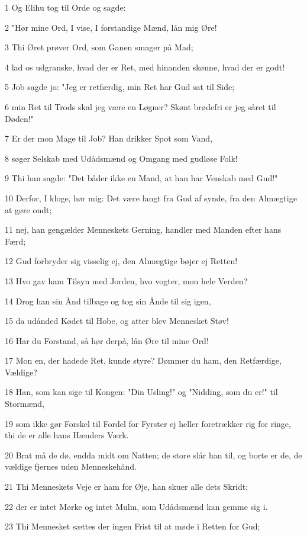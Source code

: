 \par 1 Og Elihu tog til Orde og sagde:
\par 2 "Hør mine Ord, I vise, I forstandige Mænd, lån mig Øre!
\par 3 Thi Øret prøver Ord, som Ganen smager på Mad;
\par 4 lad os udgranske, hvad der er Ret, med hinanden skønne, hvad der er godt!
\par 5 Job sagde jo: "Jeg er retfærdig, min Ret har Gud sat til Side;
\par 6 min Ret til Trods skal jeg være en Løgner? Skønt brødefri er jeg såret til Døden!"
\par 7 Er der mon Mage til Job? Han drikker Spot som Vand,
\par 8 søger Selskab med Udådsmænd og Omgang med gudløse Folk!
\par 9 Thi han sagde: "Det båder ikke en Mand, at han har Venskab med Gud!"
\par 10 Derfor, I kloge, hør mig: Det være langt fra Gud af synde, fra den Almægtige at gøre ondt;
\par 11 nej, han gengælder Menneskets Gerning, handler med Manden efter hans Færd;
\par 12 Gud forbryder sig visselig ej, den Almægtige bøjer ej Retten!
\par 13 Hvo gav ham Tilsyn med Jorden, hvo vogter, mon hele Verden?
\par 14 Drog han sin Ånd tilbage og tog sin Ånde til sig igen,
\par 15 da udånded Kødet til Hobe, og atter blev Mennesket Støv!
\par 16 Har du Forstand, så hør derpå, lån Øre til mine Ord!
\par 17 Mon en, der hadede Ret, kunde styre? Dømmer du ham, den Retfærdige, Vældige?
\par 18 Han, som kan sige til Kongen: "Din Usling!" og "Nidding, som du er!" til Stormænd,
\par 19 som ikke gør Forskel til Fordel for Fyrster ej heller foretrækker rig for ringe, thi de er alle hans Hænders Værk.
\par 20 Brat må de dø, endda midt om Natten; de store slår han til, og borte er de, de vældige fjernes uden Menneskehånd.
\par 21 Thi Menneskets Veje er ham for Øje, han skuer alle dets Skridt;
\par 22 der er intet Mørke og intet Mulm, som Udådsmænd kan gemme sig i.
\par 23 Thi Mennesket sættes der ingen Frist til at møde i Retten for Gud;
